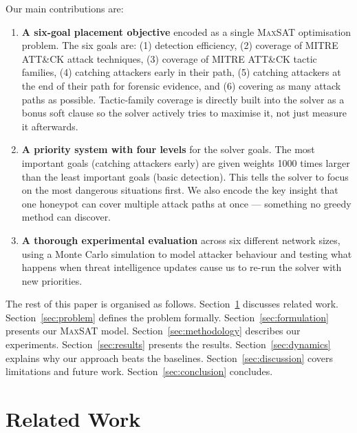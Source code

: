 \documentclass[journal]{IEEEtran}
\newcommand{\maxsat}{\textsc{MaxSAT}}
\begin{document}
Our main contributions are:

\begin{enumerate}

\item \textbf{A six-goal placement objective} encoded as a single
\maxsat{} optimisation problem. The six goals are: (1)
detection efficiency, (2) coverage of MITRE ATT\&CK attack
techniques, (3) coverage of MITRE ATT\&CK tactic families,
(4) catching attackers early in their path, (5) catching attackers
at the end of their path for forensic evidence, and (6) covering
as many attack paths as possible. Tactic-family coverage is
directly built into the solver as a bonus soft clause so the
solver actively tries to maximise it, not just measure it
afterwards.

\item \textbf{A priority system with four levels} for the
solver goals. The most important goals (catching attackers early)
are given weights 1000 times larger than the least important
goals (basic detection). This tells the solver to focus on
the most dangerous situations first. We also encode the key
insight that one honeypot can cover multiple attack paths at
once --- something no greedy method can discover.

\item \textbf{A thorough experimental evaluation} across six
different network sizes, using a Monte Carlo simulation to
model attacker behaviour and testing what happens when
threat intelligence updates cause us to re-run the solver
with new priorities.

\end{enumerate}

The rest of this paper is organised as follows.
Section~\ref{sec:related} discusses related work.
Section~\ref{sec:problem} defines the problem formally.
Section~\ref{sec:formulation} presents our \maxsat{} model.
Section~\ref{sec:methodology} describes our experiments.
Section~\ref{sec:results} presents the results.
Section~\ref{sec:dynamics} explains why our approach beats
the baselines.
Section~\ref{sec:discussion} covers limitations and future work.
Section~\ref{sec:conclusion} concludes.

\section{Related Work}
\label{sec:related}
\end{document}
